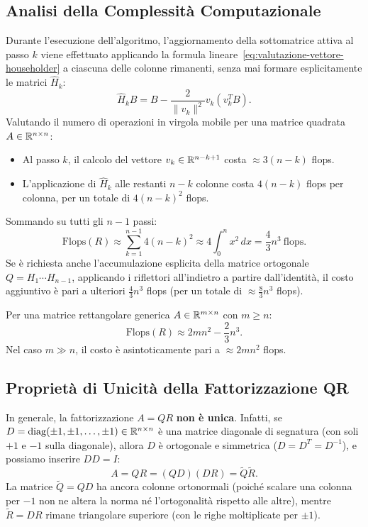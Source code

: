 \subsection{Analisi della Complessit\`a Computazionale}
Durante l'esecuzione dell'algoritmo, l'aggiornamento della sottomatrice attiva al passo $k$ viene effettuato applicando la formula lineare~\eqref{eq:valutazione-vettore-householder} a ciascuna delle colonne rimanenti, senza mai formare esplicitamente le matrici $\hat{H}_k$:
\begin{equation}
    \hat{H}_k B = B - \frac{2}{\|v_k\|^2} v_k (v_k^T B).
\end{equation}
Valutando il numero di operazioni in virgola mobile per una matrice quadrata $A \in \mathbb{R}^{n \times n}$:
\begin{itemize}
    \item Al passo $k$, il calcolo del vettore $v_k \in \mathbb{R}^{n-k+1}$ costa $\approx 3(n-k)$ flops.
    \item L'applicazione di $\hat{H}_k$ alle restanti $n - k$ colonne costa $4(n-k)$ flops per colonna, per un totale di $4(n-k)^2$ flops.
\end{itemize}
Sommando su tutti gli $n-1$ passi:
\begin{equation}
    \text{Flops}(R) \approx \sum_{k=1}^{n-1} 4(n-k)^2 \approx 4 \int_0^n x^2 \, dx = \frac{4}{3} n^3 \ \text{flops}.
\end{equation}
Se \`e richiesta anche l'accumulazione esplicita della matrice ortogonale $Q = H_1 \cdots H_{n-1}$, applicando i riflettori all'indietro a partire dall'identit\`a, il costo aggiuntivo \`e pari a ulteriori $\frac{4}{3} n^3$ flops (per un totale di $\approx \frac{8}{3} n^3$ flops).

Per una matrice rettangolare generica $A \in \mathbb{R}^{m \times n}$ con $m \ge n$:
\begin{equation}
    \text{Flops}(R) \approx 2 m n^2 - \frac{2}{3} n^3.
\end{equation}
Nel caso $m \gg n$, il costo \`e asintoticamente pari a $\approx 2 m n^2$ flops.

\subsection{Propriet\`a di Unicit\`a della Fattorizzazione QR}
In generale, la fattorizzazione $A = QR$ \textbf{non \`e unica}. 
Infatti, se $D = \operatorname{diag}(\pm 1, \pm 1, \dots, \pm 1) \in \mathbb{R}^{n \times n}$ \`e una matrice diagonale di segnatura (con soli $+1$ e $-1$ sulla diagonale), allora $D$ \`e ortogonale e simmetrica ($D = D^T = D^{-1}$), e possiamo inserire $D D = I$:
\begin{equation}
    A = Q R = (Q D) (D R) = \tilde{Q} \tilde{R}.
\end{equation}
La matrice $\tilde{Q} = Q D$ ha ancora colonne ortonormali (poich\'e scalare una colonna per $-1$ non ne altera la norma n\'e l'ortogonalit\`a rispetto alle altre), mentre $\tilde{R} = D R$ rimane triangolare superiore (con le righe moltiplicate per $\pm 1$).

